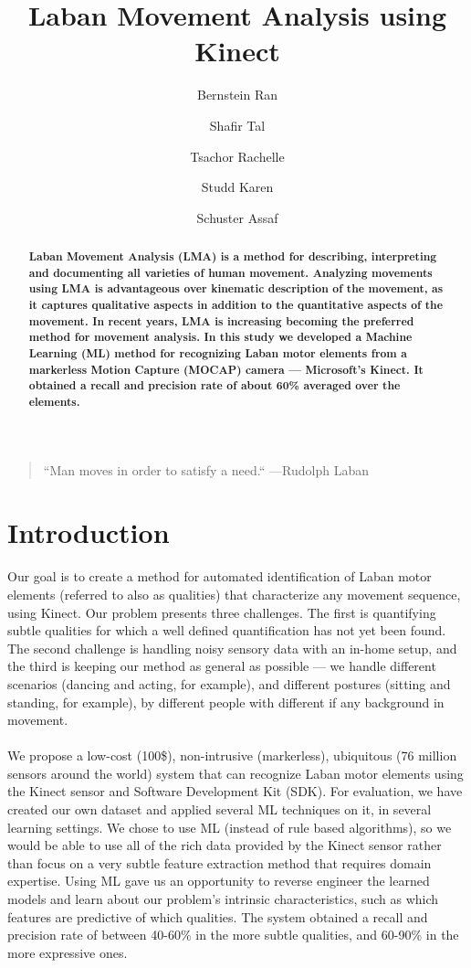 \documentclass[11pt,twocolumn,varwidth=true,a4paper,fleqn]{article}
\author[1]{Bernstein Ran}
\author[2]{Shafir Tal}
\author[3]{Tsachor Rachelle}
\author[4]{Studd Karen}
\author[1]{Schuster Assaf}
\affil[1]{Department of Computer Science, Technion I.I.T, Haifa, Israel}
\affil[2]{The Graduate School of Creative Arts Therapies, University of Haifa}
\affil[3]{School of Theatre \& Music, The University of Illinois at Chicago}
\affil[4]{School of Dance, George Mason University}
\begin{document}
\nocite{*}


\title{Laban Movement Analysis using Kinect}
\maketitle
\begin{quote}{``Man moves in order to satisfy a need.`` ---\textup{Rudolph Laban}}
\end{quote}
\begin{abstract}
\textbf{Laban Movement Analysis (LMA) is a method for describing, interpreting
and documenting all varieties of human movement. Analyzing movements using LMA is advantageous over kinematic 
description of the movement, as it captures qualitative aspects in addition to the 
quantitative aspects of the movement. In recent years, LMA is increasing becoming the preferred method for movement analysis. In this study we developed a Machine Learning (ML) method for recognizing Laban
motor elements from a markerless Motion Capture (MOCAP) camera --- Microsoft's Kinect.
It obtained a recall and precision rate of about 60\%  averaged over the
elements.}
\end{abstract}
\section{Introduction}
Our goal is to create a method for automated identification of Laban motor elements 
(referred to also as qualities) that characterize any movement sequence,
using Kinect. Our problem presents three challenges. The first is
quantifying subtle qualities for which a well defined quantification has not yet been found. The second challenge is handling noisy sensory data with an in-home setup, and the
third is keeping our method as general as possible --- we handle
different scenarios (dancing and acting, for example), and different postures
(sitting and standing, for example), by different people with different
if any background in movement. 
\\\\We propose a low-cost (100\$), non-intrusive
(markerless), ubiquitous (76 million sensors around the world) system that can recognize Laban motor elements using the Kinect sensor and Software Development Kit (SDK).
For evaluation, we have created our own dataset and applied several ML
techniques on it, in several learning settings. We chose to use ML (instead of rule based algorithms), so 
we would be able to use all of the rich data provided by the Kinect sensor rather than focus on a very 
subtle feature extraction method that requires domain expertise. Using ML gave us
an opportunity to reverse engineer the learned models and learn about
our problem's intrinsic characteristics, such as which features are predictive
of which qualities. The system obtained a recall and precision rate of between
40-60\% in the more subtle qualities, and 60-90\% in the more expressive ones.
\end{document}
